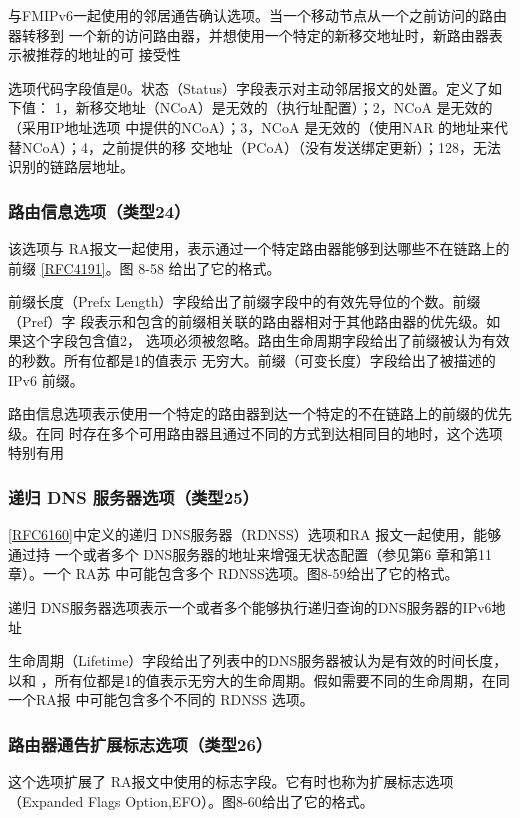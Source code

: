 与FMIPv6一起使用的邻居通告确认选项。当一个移动节点从一个之前访问的路由器转移到
一个新的访问路由器，并想使用一个特定的新移交地址时，新路由器表示被推荐的地址的可
接受性

选项代码字段值是0。状态（Status）字段表示对主动邻居报文的处置。定义了如下值：
1，新移交地址（NCoA）是无效的（执行址配置）；2，NCoA 是无效的（采用IP地址选项
中提供的NCoA）；3，NCoA 是无效的（使用NAR 的地址来代替NCoA）；4，之前提供的移
交地址（PCoA）（没有发送绑定更新）；128，无法识别的链路层地址。

\subsubsection{路由信息选项（类型24）}
该选项与 RA报文一起使用，表示通过一个特定路由器能够到达哪些不在链路上的前缀
\href{https://www.rfc-editor.org/rfc/rfc4191}{[RFC4191]}。图 8-58 给出了它的格式。

前缀长度（Prefx Length）字段给出了前缀字段中的有效先导位的个数。前缀（Pref）字
段表示和包含的前缀相关联的路由器相对于其他路由器的优先级。如果这个字段包含值2，
选项必须被忽略。路由生命周期字段给出了前缀被认为有效的秒数。所有位都是1的值表示
无穷大。前缀（可变长度）字段给出了被描述的IPv6 前缀。

路由信息选项表示使用一个特定的路由器到达一个特定的不在链路上的前缀的优先级。在同
时存在多个可用路由器且通过不同的方式到达相同目的地时，这个选项特别有用

\subsubsection{递归 DNS 服务器选项（类型25）}

\href{https://www.rfc-editor.org/rfc/rfc6160}{[RFC6160]}中定义的递归 DNS服务器（RDNSS）选项和RA 报文一起使用，能够通过持
一个或者多个 DNS服务器的地址来增强无状态配置（参见第6 章和第11章）。一个 RA苏
中可能包含多个 RDNSS选项。图8-59给出了它的格式。

递归 DNS服务器选项表示一个或者多个能够执行递归查询的DNS服务器的IPv6地址

生命周期（Lifetime）字段给出了列表中的DNS服务器被认为是有效的时间长度，以和
，所有位都是1的值表示无穷大的生命周期。假如需要不同的生命周期，在同一个RA报
中可能包含多个不同的 RDNSS 选项。

\subsubsection{路由器通告扩展标志选项（类型26）}
这个选项扩展了 RA报文中使用的标志字段。它有时也称为扩展标志选项（Expanded
Flags Option,EFO）。图8-60给出了它的格式。

